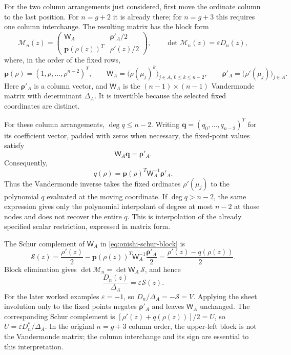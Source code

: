 \documentclass[11pt]{article}
\begin{document}
For the two column arrangements just considered, first move the ordinate column to the last position. For $n=g+2$ it is already there; for $n=g+3$ this requires one column interchange. The resulting matrix has the block form
\begin{equation}\label{eq:onishi-schur-block}
\mathcal M_n(z)=\begin{pmatrix}
\mathsf W_A & \boldsymbol{\rho}'_A/2\\
\mathbf p(\rho(z))^T & \rho'(z)/2
\end{pmatrix},\qquad
\det\mathcal M_n(z)=\varepsilon D_n(z),
\end{equation}
where, in the order of the fixed rows,
\[
\mathbf p(\rho)=(1,\rho,\ldots,\rho^{n-2})^T,\qquad
\mathsf W_A=\bigl(\rho(\mu_j)^k\bigr)_{j\in A,\,0\le k\le n-2},\qquad
\boldsymbol{\rho}'_A=\bigl(\rho'(\mu_j)\bigr)_{j\in A}.
\]
Here $\boldsymbol{\rho}'_A$ is a column vector, and $\mathsf W_A$ is the $(n-1)\times(n-1)$ Vandermonde matrix with determinant $\Delta_A$. It is invertible because the selected fixed coordinates are distinct.

For these column arrangements, $\deg q\le n-2$. Writing $\mathbf q=(q_0,\ldots,q_{n-2})^T$ for its coefficient vector, padded with zeros when necessary, the fixed-point values satisfy
\[
\mathsf W_A\mathbf q=\boldsymbol{\rho}'_A.
\]
Consequently,
\begin{equation}\label{eq:onishi-vandermonde-q}
q(\rho)=\mathbf p(\rho)^T\mathsf W_A^{-1}\boldsymbol{\rho}'_A.
\end{equation}
Thus the Vandermonde inverse takes the fixed ordinates $\rho'(\mu_j)$ to the polynomial $q$ evaluated at the moving coordinate. If $\deg q>n-2$, the same expression gives only the polynomial interpolant of degree at most $n-2$ at those nodes and does not recover the entire $q$. This is interpolation of the already specified scalar restriction, expressed in matrix form.

The Schur complement of $\mathsf W_A$ in \eqref{eq:onishi-schur-block} is
\begin{equation}\label{eq:onishi-schur-complement}
\mathcal S(z)=\frac{\rho'(z)}2
 -\mathbf p(\rho(z))^T\mathsf W_A^{-1}\frac{\boldsymbol{\rho}'_A}{2}
 =\frac{\rho'(z)-q(\rho(z))}{2}.
\end{equation}
Block elimination gives $\det\mathcal M_n=\det\mathsf W_A\,\mathcal S$, and hence
\[
\frac{D_n(z)}{\Delta_A}=\varepsilon\mathcal S(z).
\]
For the later worked examples $\varepsilon=-1$, so $D_n/\Delta_A=-\mathcal S=V$. Applying the sheet involution only to the fixed points negates $\boldsymbol{\rho}'_A$ and leaves $\mathsf W_A$ unchanged. The corresponding Schur complement is $[\rho'(z)+q(\rho(z))]/2=U$, so $U=\varepsilon D_n^*/\Delta_A$. In the original $n=g+3$ column order, the upper-left block is not the Vandermonde matrix; the column interchange and its sign are essential to this interpretation.
\end{document}
